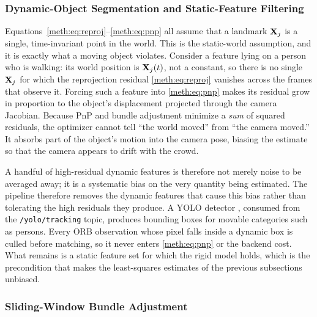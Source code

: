 \subsubsection{Dynamic-Object Segmentation and Static-Feature Filtering}

Equations~\eqref{meth:eq:reproj}--\eqref{meth:eq:pnp} all assume that a landmark $\mathbf{X}_j$ is a single, time-invariant point in the world. This is the static-world assumption, and it is exactly what a moving object violates. Consider a feature lying on a person who is walking: its world position is $\mathbf{X}_j(t)$, not a constant, so there is no single $\mathbf{X}_j$ for which the reprojection residual \eqref{meth:eq:reproj} vanishes across the frames that observe it. Forcing such a feature into \eqref{meth:eq:pnp} makes its residual grow in proportion to the object's displacement projected through the camera Jacobian. Because PnP and bundle adjustment minimize a \emph{sum} of squared residuals, the optimizer cannot tell ``the world moved'' from ``the camera moved.'' It absorbs part of the object's motion into the camera pose, biasing the estimate so that the camera appears to drift with the crowd.

A handful of high-residual dynamic features is therefore not merely noise to be averaged away; it is a systematic bias on the very quantity being estimated. The pipeline therefore removes the dynamic features that cause this bias rather than tolerating the high residuals they produce. A YOLO detector \cite{redmon2016yolo}, consumed from the \texttt{/yolo/tracking} topic, produces bounding boxes for movable categories such as persons. Every ORB observation whose pixel falls inside a dynamic box is culled before matching, so it never enters \eqref{meth:eq:pnp} or the backend cost. What remains is a static feature set for which the rigid model holds, which is the precondition that makes the least-squares estimates of the previous subsections unbiased.

\subsubsection{Sliding-Window Bundle Adjustment}

